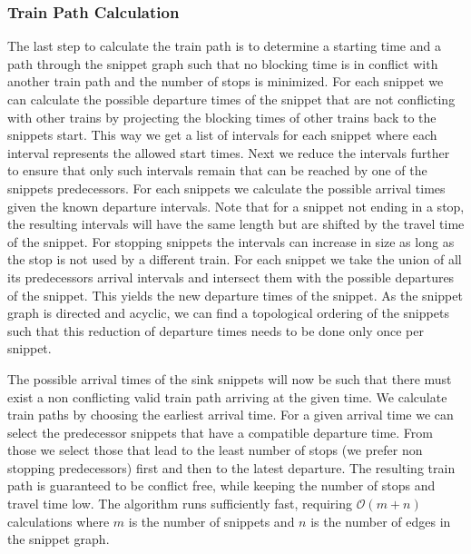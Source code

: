 \subsubsection{Train Path Calculation}

The last step to calculate the train path is to determine a starting time and a path through the snippet graph such that no blocking time is in conflict with another train path and the number of stops is minimized. For each snippet we can calculate the possible departure times of the snippet that are not conflicting with other trains by projecting the blocking times of other trains back to the snippets start. This way we get a list of intervals for each snippet where each interval represents the allowed start times. Next we reduce the intervals further to ensure that only such intervals remain that can be reached by one of the snippets predecessors. For each snippets we calculate the possible arrival times given the known departure intervals. Note that for a snippet not ending in a stop, the resulting intervals will have the same length but are shifted by the travel time of the snippet. For stopping snippets the intervals can increase in size as long as the stop is not used by a different train. For each snippet we take the union of all its predecessors arrival intervals and intersect them with the possible departures of the snippet. This yields the new departure times of the snippet. As the snippet graph is directed and acyclic, we can find a topological ordering of the snippets such that this reduction of departure times needs to be done only once per snippet.

The possible arrival times of the sink snippets will now be such that there must exist a non conflicting valid train path arriving at the given time. We calculate train paths by choosing the earliest arrival time. For a given arrival time we can select the predecessor snippets that have a compatible departure time. From those we select those that lead to the least number of stops (we prefer non stopping predecessors) first and then to the latest departure. The resulting train path is guaranteed to be conflict free, while keeping the number of stops and travel time low. The algorithm runs sufficiently fast, requiring $\mathcal{O}(m+n)$ calculations where $m$ is the number of snippets and $n$ is the number of edges in the snippet graph.


